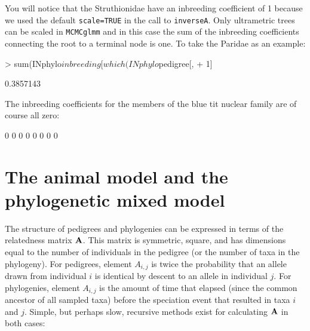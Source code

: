 \documentclass{article}
\begin{document}
You will notice that the Struthionidae have an inbreeding coefficient of 1 because we used the default \texttt{scale=TRUE} in the call to \texttt{inverseA}.  Only ultrametric trees can be scaled in \texttt{MCMCglmm} and in this case the sum of the inbreeding coefficients connecting the root to a terminal node is one. To take the Paridae as an example:

\begin{Schunk}
\begin{Sinput}
> sum(INphylo$inbreeding[which(INphylo$pedigree[, 
+     1] %
\end{Sinput}
\begin{Soutput}
[1] 0.3857143
\end{Soutput}
\end{Schunk}

The inbreeding coefficients for the members of the blue tit nuclear family are of course all zero:

\begin{Schunk}
\begin{Soutput}
[1] 0 0 0 0 0 0 0 0
\end{Soutput}
\end{Schunk}

\section{The animal model and the phylogenetic mixed model}

The structure of pedigrees and phylogenies can be expressed in terms of the relatedness matrix  ${\bf A}$. This matrix is symmetric, square, and has dimensions equal to the number of individuals in the pedigree (or the number of taxa in the phylogeny). For pedigrees, element $A_{i,j}$ is twice the probability that an allele drawn from individual $i$ is identical by descent to an allele in individual $j$.  For phylogenies, element $A_{i,j}$ is the amount of time that elapsed (since the common ancestor of all sampled taxa) before the speciation event that resulted in taxa $i$ and $j$. Simple, but perhaps slow, recursive methods exist for calculating  ${\bf A}$ in both cases:
\end{document}
